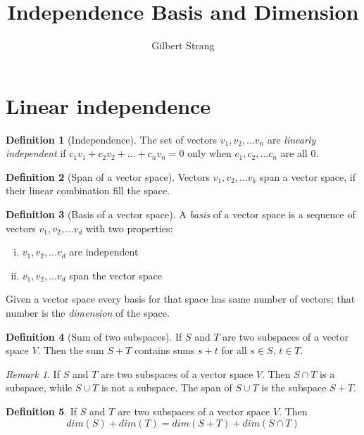 \documentclass{tufte-handout}
\author{Gilbert Strang}
\title{Independence Basis and Dimension}
\theoremstyle{definition} \newtheorem{definition}{Definition}
\theoremstyle{remark} \newtheorem{remark}{Remark}
\begin{document}
\maketitle

\section{Linear independence}
\begin{definition}[Independence]
  The set of vectors $v_1, v_2, \ldots v_n$ are
  \emph{linearly independent} if $c_1v_1 + c_2v_2+ \ldots + c_nv_n = 0$
  only when $c_1, c_2, \ldots c_n$ are all $0$.
\end{definition}

\begin{definition}[Span of a vector space]
  Vectors $v_1, v_2, \ldots v_k$ span a vector space, if their linear
  combination fill the space.
\end{definition}

\begin{definition}[Basis of a vector space]
  A \emph{basis} of a vector space is a sequence of vectors
  $v_1, v_2, \ldots v_d$ with two properties:
  \begin{enumerate}[(i)]
  \item $v_1, v_2, \ldots v_d$ are independent
  \item $v_1, v_2, \ldots v_d$ span the vector space
  \end{enumerate}
\end{definition}
Given a vector space every basis for that space has same number of
vectors; that number is the \emph{dimension} of the space.

\begin{definition}[Sum of two subspaces]
  If $S$ and $T$ are two subspaces of a vector space $V$. Then the sum
  $S + T$ contains sums $s + t$ for all $s \in S$, $t \in T$.
\end{definition}

\begin{remark}
  If $S$ and $T$ are two subspaces of a vector space
$V$. Then $S \cap T$ is a subspace, while $S \cup T$ is not a subspace.
The span of $S \cup T$ is the subspace $S + T$.
\end{remark}

\begin{definition}
  If $S$ and $T$ are two subspaces of a vector space $V$. Then
  \begin{equation*}
    dim(S) + dim(T) = dim(S + T) + dim(S \cap T)
  \end{equation*}
\end{definition}
\end{document}
